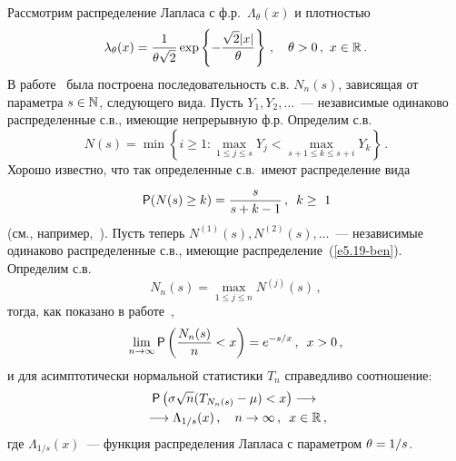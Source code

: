 \begin{multicols}{2}
Рассмотрим распределение Лапласа с ф.р.\ $\Lambda_\theta(x)$ и
плотностью
$$
\lambda_\theta(x)=\displaystyle\frac{\displaystyle 1\mathstrut}{\displaystyle \theta\sqrt 2\mathstrut}\exp\left\{
-\displaystyle\frac{\displaystyle \sqrt{2}|x|\mathstrut}{\displaystyle \theta\mathstrut} \right\}\,, \ \ \   \theta > 0\,,\  x\in\mathbb R\,.
$$
В работе~\cite{9-ben} была построена последовательность с.в. $N_n(s)$,
зависящая от параметра $s \in \mathbb N$, сле\-ду\-юще\-го вида. Пусть $Y_1, Y_2,
\ldots$~--- независимые одинаково распределенные с.в., имеющие
непрерывную ф.р. Определим с.в.
$$
N(s) = \min\left\{ i\geq1: \max\limits_{1\leq j\leq s} Y_j < \max\limits_{s+1\leq k
\leq s+i} Y_k \right\}\,.
$$
Хорошо известно, что так определенные с.в.\ имеют распределение вида
\begin{equation}
{{\sf P}}(N(s) \geq k) = \displaystyle\frac{\displaystyle s\mathstrut}{\displaystyle s+k-1\mathstrut}\,, \enskip   k \geq \ 1\label{e5.19-ben}
\end{equation}
(см., например,~\cite{26-ben, 27-ben}). Пусть теперь  $N^{(1)}(s),
N^{(2)}(s),\ldots$~--- независимые одинаково распределенные с.в.,
имеющие распределение~(\ref{e5.19-ben}). Определим с.в.\
$$
N_n(s) = \max\limits_{1\leq j\leq n} N^{(j)}(s)\,,
$$
тогда, как показано в работе~\cite{9-ben},
\begin{equation}
\lim\limits_{n\to\infty} {{\sf P}}\left( \displaystyle\frac{\displaystyle N_n(s)\mathstrut}{\displaystyle n\mathstrut} < x \right) = e^{-s/x}\,,
\enskip  x>0\,,\label{e5.20-ben}
\end{equation}
и для асимптотически нормальной статистики $T_n$ справедливо соотношение:
\begin{multline*}
{{\sf P}}\left(\sigma\sqrt{n}(T_{N_n(s)} - \mu) < x\right) \longrightarrow{}\\
{}\longrightarrow
\Lambda_{1/s}(x)\,,  \quad n\to\infty\,,\enskip  x\in\mathbb R\,,
\end{multline*}
где $\Lambda_{1/s}(x)$~--- функция распределения Лапласа с параметром
$\theta\hm=1/s$.


\end{multicols}
